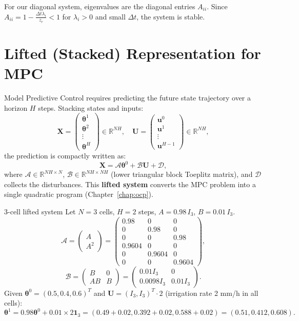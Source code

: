 \documentclass[12pt,a4paper,openany]{book}
\newcommand{\R}{\mathbb{R}}
\newcommand{\bu}{\bm{u}}
\newcommand{\bth}{\bm{\theta}}
\begin{document}
For our diagonal system, eigenvalues are the diagonal entries $A_{ii}$. Since $A_{ii} = 1-\frac{\Delta t\lambda_i}{z_r} < 1$ for $\lambda_i>0$ and small $\Delta t$, the system is stable.

\section{Lifted (Stacked) Representation for MPC}

Model Predictive Control requires predicting the future state trajectory over a horizon $H$ steps. Stacking states and inputs:
\[
\mathbf{X} = \begin{pmatrix}\bth^1\\\bth^2\\\vdots\\\bth^H\end{pmatrix}\in\R^{NH},\quad
\mathbf{U} = \begin{pmatrix}\bu^0\\\bu^1\\\vdots\\\bu^{H-1}\end{pmatrix}\in\R^{NH},
\]
the prediction is compactly written as:
\begin{equation}
  \mathbf{X} = \mathcal{A}\bth^0 + \mathcal{B}\mathbf{U} + \mathcal{D},
  \label{eq:lifted}
\end{equation}
where $\mathcal{A}\in\R^{NH\times N}$, $\mathcal{B}\in\R^{NH\times NH}$ (lower triangular block Toeplitz matrix), and $\mathcal{D}$ collects the disturbances. This \textbf{lifted system} converts the MPC problem into a single quadratic program (Chapter~\ref{chap:ocp}).

\begin{exbox}{3-cell lifted system}
Let $N=3$ cells, $H=2$ steps, $A=0.98\,I_3$, $B=0.01\,I_3$.
\[
\mathcal{A}=\begin{pmatrix}A\\A^2\end{pmatrix}=\begin{pmatrix}0.98&0&0\\0&0.98&0\\0&0&0.98\\0.9604&0&0\\0&0.9604&0\\0&0&0.9604\end{pmatrix},
\]
\[
\mathcal{B}=\begin{pmatrix}B&0\\AB&B\end{pmatrix}=\begin{pmatrix}0.01I_3&0\\0.0098I_3&0.01I_3\end{pmatrix}.
\]
Given $\bth^0=(0.5,0.4,0.6)^T$ and $\mathbf{U}=(I_3,I_3)^T\cdot 2$ (irrigation rate 2 mm/h in all cells):
\[\bth^1=0.98\bth^0+0.01\times 2\mathbf{1}_3=(0.49+0.02, 0.392+0.02, 0.588+0.02)=(0.51,0.412,0.608).\]
\end{exbox}
\end{document}
